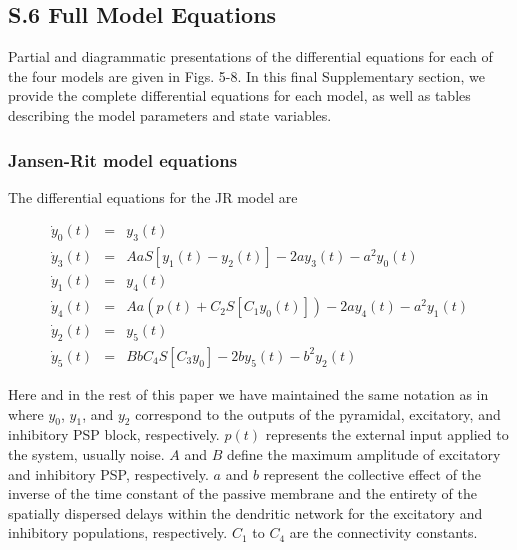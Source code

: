 \documentclass[12pt,twoside]{article}
\begin{document}
\newpage
\subsection*{S.6 Full Model Equations}

Partial and diagrammatic presentations of the differential equations for each of the four models are given in Figs. 5-8. In this final Supplementary section, we provide the complete differential equations for each model, as well as tables describing the model parameters and state variables. 


\subsubsection*{Jansen-Rit model equations}

The differential equations for the JR model are

\begin{eqnarray}
    \dot{y}_{0}(t) &=& y_{3}(t)\\
    \dot{y}_{3}(t) &=& AaS[y_{1}(t)-y_{2}(t)] - 2ay_{3}(t) - a^{2}y_{0}(t)\\
    \dot{y}_{1}(t) &=& y_{4}(t)\\
    \dot{y}_{4}(t) &=& Aa(p(t) + C_{2}S[C_{1}y_{0}(t)]) - 2ay_{4}(t) - a^{2}y_{1}(t)\\
    \dot{y}_{2}(t) &=& y_{5}(t)\\
    \dot{y}_{5}(t) &=& BbC_{4}S[C_{3}y_{0}] - 2by_{5}(t) - b^{2}y_{2}(t)
\end{eqnarray}


Here and in the rest of this paper we have maintained the same notation as in \citet{jansen1995electroencephalogram} where $y_0$, $y_1$, and $y_2$ correspond to the outputs of the pyramidal, excitatory, and inhibitory PSP block, respectively. $p(t)$ represents the external input applied to the system, usually noise. $A$ and $B$ define the maximum amplitude of excitatory and inhibitory PSP, respectively. $a$ and $b$ represent the collective effect of the inverse of the time constant of the passive membrane and the entirety of the spatially dispersed delays within the dendritic network for the excitatory and inhibitory populations, respectively. $C_1$ to $C_4$ are the connectivity constants.
\end{document}
